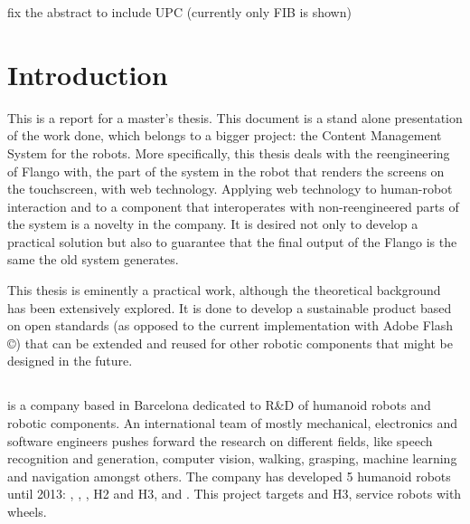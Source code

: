 
fix the abstract to include UPC (currently only FIB is shown)

\chapter{Introduction}
This is a report for a master's thesis.
This document is a stand alone presentation of the work done, which belongs to a bigger project: the Content Management System for the robots.
More specifically, this thesis deals with the reengineering of Flango \cm with, the part of the system in the robot that renders the screens on the touchscreen, with web technology.
Applying web technology to human-robot interaction and to a component that interoperates with non-reengineered parts of the system is a novelty in the company.
It is desired not only to develop a practical solution but also to guarantee that the final output of the Flango \cm is the same the old system generates.

This thesis is eminently a practical work, although the theoretical background has been extensively explored. 
It is done to develop a sustainable product based on open standards (as opposed to the current implementation with Adobe Flash \copyright) that can be extended and reused for other robotic components that might be designed in the future.

\section{\company}
\company is a company based in Barcelona dedicated to R\&D of humanoid robots and robotic components. 
An international team of mostly mechanical, electronics and software engineers pushes forward the research on different fields, like speech recognition and generation, computer vision, walking, grasping, machine learning and navigation amongst others.
The company has developed 5 humanoid robots until 2013: , , , H2 and H3, and .
This project targets  and H3, service robots with wheels.

